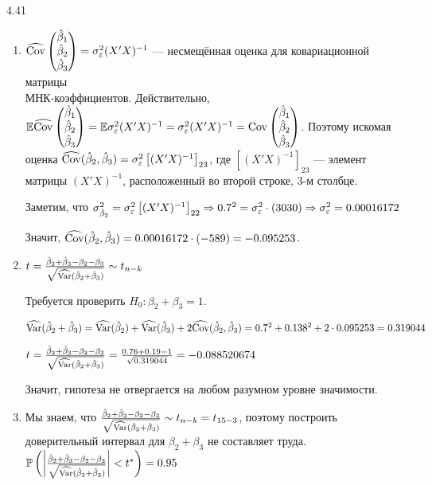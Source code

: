 \begin{solution}{{4.41}}
\begin{enumerate}
\item $\widehat{\operatorname{Cov}}\begin{pmatrix}
\hat{\beta}_1 \\
\hat{\beta}_2 \\
\hat{\beta}_3 \\
\end{pmatrix} = \sigma_{\varepsilon}^2 (X'X)^{-1}$ — несмещённая оценка для ковариационной матрицы \\ МНК-коэффициентов. Действительно, $\mathbb{E}\widehat{\operatorname{Cov}}\begin{pmatrix}
\hat{\beta}_1 \\
\hat{\beta}_2 \\
\hat{\beta}_3 \\
\end{pmatrix} = \mathbb{E}\sigma_{\varepsilon}^2 (X'X)^{-1} = \sigma_{\varepsilon}^2 (X'X)^{-1} = \operatorname{Cov}\begin{pmatrix}
\hat{\beta}_1 \\
\hat{\beta}_2 \\
\hat{\beta}_3 \\
\end{pmatrix}$. Поэтому искомая оценка $\widehat{\operatorname{Cov}}(\hat{\beta}_2, \hat{\beta}_3) = \sigma_{\varepsilon}^2 \left[ (X' X)^{-1} \right]_{23}$, где $\left[ (X' X)^{-1} \right]_{23}$ — элемент матрицы $(X' X)^{-1}$, расположенный во второй строке, 3-м столбце.

Заметим, что $\sigma_{\hat{\beta}_2}^2 = \sigma_{\varepsilon}^2 \left[ (X' X)^{-1} \right]_{22} \Rightarrow 0.7^2 = \sigma_{\varepsilon}^2 \cdot (3030) \Rightarrow \sigma_{\varepsilon}^2 = 0.00016172$

Значит, $\widehat{\operatorname{Cov}}(\hat{\beta}_2, \hat{\beta}_3) = 0.00016172 \cdot (-589) = -0.095253$.

\item $t = \frac{\hat{\beta}_2 + \hat{\beta}_3 - \beta_2 - \beta_3}{\sqrt{\widehat{\operatorname{Var}}(\hat{\beta}_2 + \hat{\beta}_3)}} \sim t_{n-k}$

Требуется проверить $H_0: \beta_2 + \beta_3 = 1$.

$\widehat{\operatorname{Var}}(\hat{\beta}_2 + \hat{\beta}_3) = \widehat{\operatorname{Var}}(\hat{\beta}_2) + \widehat{\operatorname{Var}}(\hat{\beta}_3) + 2\widehat{\operatorname{Cov}}(\hat{\beta}_2, \hat{\beta}_3) = 0.7^2 + 0.138^2 + 2 \cdot 0.095253 = 0.319044$

$t = \frac{\hat{\beta}_2 + \hat{\beta}_3 - \beta_2 - \beta_3}{\sqrt{\widehat{\operatorname{Var}}(\hat{\beta}_2 + \hat{\beta}_3)}} = \frac{0.76 + 0.19 - 1}{\sqrt{0.319044}} = -0.088520674$

Значит, гипотеза не отвергается на любом разумном уровне значимости.

\item Мы знаем, что $\frac{\hat{\beta}_2 + \hat{\beta}_3 - \beta_2 - \beta_3}{\sqrt{\widehat{\operatorname{Var}}(\hat{\beta}_2 + \hat{\beta}_3)}} \sim t_{n-k} = t_{15-3}$, поэтому построить доверительный интервал для $\beta_2 + \beta_3$ не составляет труда. $\mathbb{P} \left( \left| \frac{\hat{\beta}_2 + \hat{\beta}_3 - \beta_2 - \beta_3}{\sqrt{\widehat{\operatorname{Var}}(\hat{\beta}_2 + \hat{\beta}_3)}} \right| < t^* \right) = 0.95$


\end{enumerate}
\end{solution}

